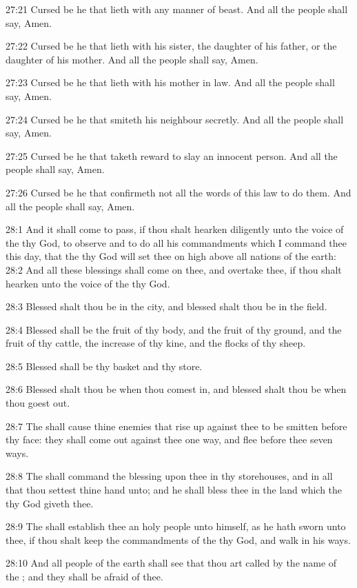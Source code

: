 27:21 Cursed be he that lieth with any manner of beast. And all the
people shall say, Amen.

27:22 Cursed be he that lieth with his sister, the daughter of his
father, or the daughter of his mother. And all the people shall say,
Amen.

27:23 Cursed be he that lieth with his mother in law. And all the
people shall say, Amen.

27:24 Cursed be he that smiteth his neighbour secretly. And all the
people shall say, Amen.

27:25 Cursed be he that taketh reward to slay an innocent person. And
all the people shall say, Amen.

27:26 Cursed be he that confirmeth not all the words of this law to do
them. And all the people shall say, Amen.

28:1 And it shall come to pass, if thou shalt hearken diligently unto
the voice of the \LORD thy God, to observe and to do all his
commandments which I command thee this day, that the \LORD thy God will
set thee on high above all nations of the earth: 28:2 And all these
blessings shall come on thee, and overtake thee, if thou shalt hearken
unto the voice of the \LORD thy God.

28:3 Blessed shalt thou be in the city, and blessed shalt thou be in
the field.

28:4 Blessed shall be the fruit of thy body, and the fruit of thy
ground, and the fruit of thy cattle, the increase of thy kine, and the
flocks of thy sheep.

28:5 Blessed shall be thy basket and thy store.

28:6 Blessed shalt thou be when thou comest in, and blessed shalt thou
be when thou goest out.

28:7 The \LORD shall cause thine enemies that rise up against thee to
be smitten before thy face: they shall come out against thee one way,
and flee before thee seven ways.

28:8 The \LORD shall command the blessing upon thee in thy storehouses,
and in all that thou settest thine hand unto; and he shall bless thee
in the land which the \LORD thy God giveth thee.

28:9 The \LORD shall establish thee an holy people unto himself, as he
hath sworn unto thee, if thou shalt keep the commandments of the \LORD
thy God, and walk in his ways.

28:10 And all people of the earth shall see that thou art called by
the name of the \LORD; and they shall be afraid of thee.

